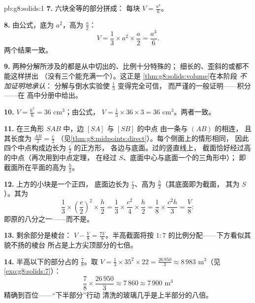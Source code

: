 \begin{solution}{pb:g8:solids:1}
\textbf{7.} 六块全等的部分拼成：
每块 $V = \frac{a^3}{6}$。

\textbf{8.} 由公式，底为 $a^2$，高为 $\frac a2$：
\[
V = \frac13 \times a^2 \times \frac{a}{2} = \frac{a^3}{6} .
\]
两个结果一致。

\textbf{9.} 两种分解所涉及的都是从中切出的、比例十分特殊的；
细长的、歪斜的或都不能这样拼出
（没有三个能充满一个）。这正是
\cref{thm:g8:solids:volume}在本阶段
\emph{不加证明地承认}：
分解与倒水实验使 $\frac13$ 变得完全可信，
而严谨的一般证明——积分——在
高中分册中给出。

\textbf{10.} $V = \frac{6^3}{6} = 36$ cm$^3$；由公式，
$V = \frac13 \times 36 \times 3 = 36$ cm$^3$。两者一致。

\textbf{11.} 在三角形 $SAB$ 中，边 $[SA]$ 与 $[SB]$ 的中点
由一条与 $(AB)$ 的相连，
且其长度为 $\frac{AB}{2} = \frac{c}{2}$
（见\cref{thm:g8:midpoints:direct}）。每个侧面上的情形相同，
因此四个中点构成边长为 $\frac c2$ 的正方形，
各边与底面。过的竖直线上，
截面恰好经过高的中点（再次用到中点定理，
在经过 $S$、底面中心与底面一个的三角形中）；
即截面所在平面的高为 $\frac h2$。

\textbf{12.} 上方的小块是一个正四，
底面边长为 $\frac c2$、高为 $\frac h2$（其底面即为截面，
其为 $S$）。其为
\[
\frac13 \times \left(\frac c2\right)^2 \times \frac h2
= \frac13 \times \frac{c^2}{4} \times \frac h2
= \frac{1}{8} \times \frac{c^2 h}{3}
= \frac{V}{8} :
\]
即原的八分之一——而不是。

\textbf{13.} 剩余部分是棱台：
$V - \frac V8 = \frac{7V}{8}$。半高截面将按
$1 : 7$ 的比例分配——下方看似其貌不扬的棱台
所占是上方尖顶部分的七倍。

\textbf{14.} 半高以下的部分占的 $\frac78$。取
$V = \frac13 \times 35^2 \times 22 = \frac{26\,950}{3} \approx
8\,983$ m$^3$（见\cref{exo:g8:solids:7}）：
\[
\frac78 \times \frac{26\,950}{3} \approx 7\,860 \approx
7\,900 \text{ m}^3
\]
精确到百位——“下半部分”行动
清洗的玻璃几乎是上半部分的八倍。


\end{solution}
